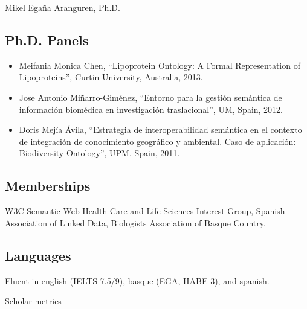 \documentclass[english,11pt,a4paper,oneside]{article}
\begin{document}
\begin{cv}{Mikel Ega\~na Aranguren, Ph.D. }
\begin{itemize}
\end{itemize}

\subsection*{Ph.D. Panels}
\begin{itemize}

	\item Meifania Monica Chen, ``Lipoprotein Ontology: A Formal Representation of Lipoproteins'', Curtin University, Australia, 2013. 

	\item Jose Antonio Mi\~narro-Gim\'enez, ``Entorno para la gesti\'on sem\'antica de informaci\'on biom\'edica en investigaci\'on traslacional'', UM, Spain, 2012. 

	\item Doris Mej\'ia \'Avila, ``Estrategia de interoperabilidad sem\'antica en el contexto de integraci\'on de conocimiento geogr\'afico y ambiental. Caso de aplicaci\'on: Biodiversity Ontology'', UPM, Spain, 2011. 
\end{itemize}

\subsection*{Memberships} 
W3C Semantic Web Health Care and Life Sciences Interest Group, Spanish Association of Linked Data, Biologists Association of Basque Country. 


\subsection*{Languages}
Fluent in english (IELTS 7.5/9), basque (EGA, HABE 3), and spanish.




\begin{cvlist}{Scholar metrics}


\end{cvlist}
\end{cv}
\end{document}
